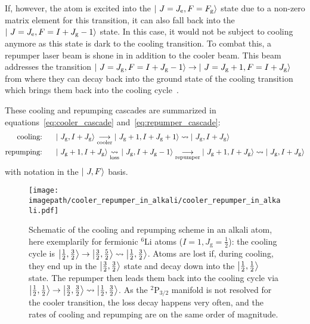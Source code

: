 If, however, the atom is excited into the $\Ket{~J = J_\text{e}, F = F_\text{g}}$ state due to a non-zero matrix element for this transition, it can also fall back into the $\Ket{~J = J_\text{e}, F = I + J_\text{g} - 1}$ state. In this case, it would not be subject to cooling anymore as this state is dark to the cooling transition. To combat this, a repumper laser beam is shone in in addition to the cooler beam. This beam addresses the transition $\Ket{~J = J_\text{g}, F = I + J_\text{g} - 1} \rightarrow \Ket{~J = J_\text{g} + 1, F = I + J_\text{g}}$ from where they can decay back into the ground state of the cooling transition which brings them back into the cooling cycle~\cite{metcalf_laser_1999}.

These cooling and repumping cascades are summarized in equations~\eqref{eq:cooler_cascade} and~\eqref{eq:repumper_cascade}:
\begin{align}
    \label{eq:cooler_cascade}\text{cooling:}~~~~~ & \Ket{~J_\text{g},I + J_\text{g}} \underset{\text{cooler}}{\longrightarrow} \Ket{~J_\text{g} + 1, I + J_\text{g} + 1} \rightsquigarrow  \Ket{~J_\text{g}, I + J_\text{g}}\\
    \label{eq:repumper_cascade}\text{repumping:}~~~~~ & \Ket{~J_\text{g} + 1, I + J_\text{g}} \underset{\text{loss}}{\rightsquigarrow} \Ket{~J_\text{g}, I + J_\text{g} - 1}  \underset{\text{repumper}}{\longrightarrow} \Ket{~J_\text{g} + 1, I + J_\text{g}} \rightsquigarrow  \Ket{~J_\text{g}, I + J_\text{g}}
\end{align}
with notation in the $\Ket{~J, F}$ basis.

\begin{figure}
    \centering
    \texttt{[image: \\imagepath/cooler\_repumper\_in\_alkali/cooler\_repumper\_in\_alkali.pdf]}
    \caption{Schematic of the cooling and repumping scheme in an alkali atom, here exemplarily for fermionic $^6$Li atoms ($I = 1, J_\text{g} = \frac{1}{2}$): the cooling cycle is $\Ket{\frac{1}{2}, \frac{3}{2}} \rightarrow \Ket{\frac{3}{2}, \frac{5}{2}} \rightsquigarrow \Ket{\frac{1}{2}, \frac{3}{2}}$. Atoms are lost if, during cooling, they end up in the $\Ket{\frac{3}{2}, \frac{3}{2}}$ state and decay down into the $\Ket{\frac{1}{2}, \frac{1}{2}}$ state. The repumper then leads them back into the cooling cycle via $\Ket{\frac{1}{2}, \frac{1}{2}} \rightarrow \Ket{\frac{3}{2}, \frac{3}{2}} \rightsquigarrow \Ket{\frac{1}{2}, \frac{3}{2}}$. As the $^2\text{P}_{3/2}$ manifold is not resolved for the cooler transition, the loss decay happens very often, and the rates of cooling and repumping are on the same order of magnitude.}
    \label{fig:cooler_repumper_in_alkali}
\end{figure}


